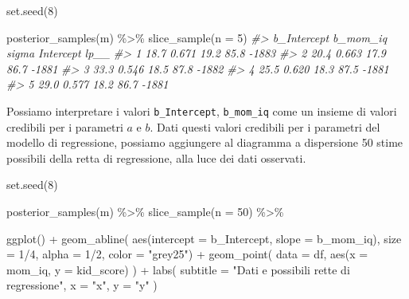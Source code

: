 \documentclass[
  10pt,
  italian,
  a4paper,
  extrafontsizes,onecolumn,openright
  ]{memoir}
\newenvironment{Shaded}{\begin{snugshade}}{\end{snugshade}}
\newcommand{\AttributeTok}[1]{\textcolor[rgb]{0.77,0.63,0.00}{#1}}
\newcommand{\CommentTok}[1]{\textcolor[rgb]{0.56,0.35,0.01}{\textit{#1}}}
\newcommand{\DecValTok}[1]{\textcolor[rgb]{0.00,0.00,0.81}{#1}}
\newcommand{\FunctionTok}[1]{\textcolor[rgb]{0.00,0.00,0.00}{#1}}
\newcommand{\NormalTok}[1]{#1}
\newcommand{\SpecialCharTok}[1]{\textcolor[rgb]{0.00,0.00,0.00}{#1}}
\newcommand{\StringTok}[1]{\textcolor[rgb]{0.31,0.60,0.02}{#1}}
\begin{document}
\begin{Shaded}
\begin{Highlighting}[]
\FunctionTok{set.seed}\NormalTok{(}\DecValTok{8}\NormalTok{)}

\FunctionTok{posterior\_samples}\NormalTok{(m) }\SpecialCharTok{\%\textgreater{}\%} 
  \FunctionTok{slice\_sample}\NormalTok{(}\AttributeTok{n =} \DecValTok{5}\NormalTok{)}
\CommentTok{\#\textgreater{}   b\_Intercept b\_mom\_iq sigma Intercept  lp\_\_}
\CommentTok{\#\textgreater{} 1        18.7    0.671  19.2      85.8 {-}1883}
\CommentTok{\#\textgreater{} 2        20.4    0.663  17.9      86.7 {-}1881}
\CommentTok{\#\textgreater{} 3        33.3    0.546  18.5      87.8 {-}1882}
\CommentTok{\#\textgreater{} 4        25.5    0.620  18.3      87.5 {-}1881}
\CommentTok{\#\textgreater{} 5        29.0    0.577  18.2      86.7 {-}1881}
\end{Highlighting}
\end{Shaded}

Possiamo interpretare i valori \texttt{b\_Intercept}, \texttt{b\_mom\_iq} come un insieme di valori credibili per i parametri \(a\) e \(b\). Dati questi valori credibili per i parametri del modello di regressione, possiamo aggiungere al diagramma a dispersione 50 stime possibili della retta di regressione, alla luce dei dati osservati.

\begin{Shaded}
\begin{Highlighting}[]
\FunctionTok{set.seed}\NormalTok{(}\DecValTok{8}\NormalTok{)}

\FunctionTok{posterior\_samples}\NormalTok{(m) }\SpecialCharTok{\%\textgreater{}\%} 
  \FunctionTok{slice\_sample}\NormalTok{(}\AttributeTok{n =} \DecValTok{50}\NormalTok{) }\SpecialCharTok{\%\textgreater{}\%} 
  
  \FunctionTok{ggplot}\NormalTok{() }\SpecialCharTok{+}
  \FunctionTok{geom\_abline}\NormalTok{(}
    \FunctionTok{aes}\NormalTok{(}\AttributeTok{intercept =}\NormalTok{ b\_Intercept, }\AttributeTok{slope =}\NormalTok{ b\_mom\_iq),}
        \AttributeTok{size =} \DecValTok{1}\SpecialCharTok{/}\DecValTok{4}\NormalTok{, }\AttributeTok{alpha =} \DecValTok{1}\SpecialCharTok{/}\DecValTok{2}\NormalTok{, }\AttributeTok{color =} \StringTok{"grey25"}\NormalTok{) }\SpecialCharTok{+}
  \FunctionTok{geom\_point}\NormalTok{(}
    \AttributeTok{data =}\NormalTok{ df,}
    \FunctionTok{aes}\NormalTok{(}\AttributeTok{x =}\NormalTok{ mom\_iq, }\AttributeTok{y =}\NormalTok{ kid\_score)}
\NormalTok{  ) }\SpecialCharTok{+}
  \FunctionTok{labs}\NormalTok{(}
    \AttributeTok{subtitle =} \StringTok{"Dati e possibili rette di regressione"}\NormalTok{,}
    \AttributeTok{x =} \StringTok{"x"}\NormalTok{,}
    \AttributeTok{y =} \StringTok{"y"}
\NormalTok{  )}
\end{Highlighting}
\end{Shaded}
\end{document}
